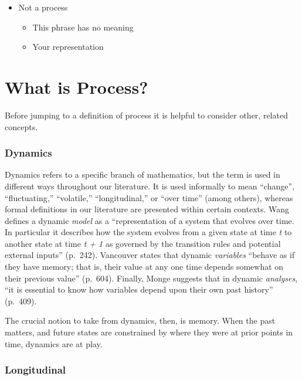 \documentclass[english,,man]{apa6}
\providecommand{\tightlist}{%
  \setlength{\itemsep}{0pt}\setlength{\parskip}{0pt}}
\theoremstyle{definition}
\theoremstyle{definition}
\theoremstyle{definition}
\theoremstyle{remark}
\begin{document}
\begin{itemize}
\item
  Not a process

  \begin{itemize}
  \tightlist
  \item
    This phrase has no meaning
  \item
    Your representation
  \end{itemize}
\end{itemize}

\hypertarget{what-is-process}{%
\section{What is Process?}\label{what-is-process}}

Before jumping to a definition of process it is helpful to consider
other, related concepts.

\hypertarget{dynamics}{%
\subsubsection{Dynamics}\label{dynamics}}

Dynamics refers to a specific branch of mathematics, but the term is
used in different ways throughout our literature. It is used informally
to mean \enquote{change}, \enquote{fluctuating,} \enquote{volatile,}
\enquote{longitudinal,} or \enquote{over time} (among others), whereas
formal definitions in our literature are presented within certain
contexts. Wang defines a dynamic \emph{model} as a
\enquote{representation of a system that evolves over time. In
particular it describes how the system evolves from a given state at
time \emph{t} to another state at time \emph{t + 1} as governed by the
transition rules and potential external inputs} (p.~242). Vancouver
states that dynamic \emph{variables} \enquote{behave as if they have
memory; that is, their value at any one time depends somewhat on their
previous value} (p.~604). Finally, Monge suggests that in dynamic
\emph{analyses}, \enquote{it is essential to know how variables depend
upon their own past history} (p.~409).

The crucial notion to take from dynamics, then, is memory. When the past
matters, and future states are constrained by where they were at prior
points in time, dynamics are at play.

\hypertarget{longitudinal}{%
\subsubsection{Longitudinal}\label{longitudinal}}
\end{document}
